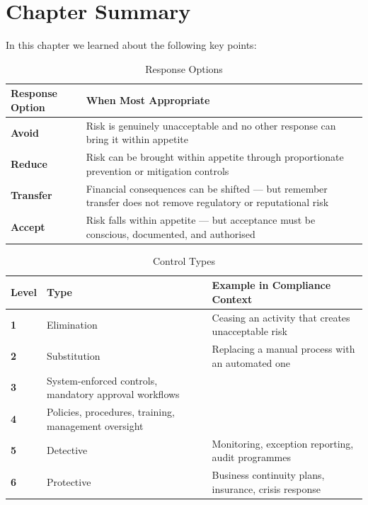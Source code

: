 \newpage
\section{Chapter Summary}
In this chapter we learned about the following key points:
\begin{table}[H]
  \centering
  \renewcommand{\arraystretch}{1.5}
  \begin{tabularx}{\textwidth}{ | >{\raggedright\arraybackslash}p{} 
                                | >{\raggedright\arraybackslash}X | }
    \hline
    \textbf{Response Option} & \textbf{When Most Appropriate} \\
    \hline
    \textbf{Avoid} & Risk is genuinely unacceptable and no other response can bring it within appetite\\
    \hline
    \textbf{Reduce} & Risk can be brought within appetite through proportionate prevention or mitigation controls\\
    \hline
    \textbf{Transfer} & Financial consequences can be shifted — but remember transfer does not remove regulatory or reputational risk\\
    \hline
    \textbf{Accept} & Risk falls within appetite — but acceptance must be conscious, documented, and authorised\\
    \hline
  \end{tabularx}
  \caption{Response Options}
\end{table}

\begin{table}[H]
  \centering
  \renewcommand{\arraystretch}{1.5}
  \begin{tabularx}{\textwidth}{ | >{\raggedright\arraybackslash}p{} 
                                | >{\raggedright\arraybackslash}p{} 
                                | >{\raggedright\arraybackslash}X | }
    \hline
    \textbf{Level} & \textbf{Type} & \textbf{Example in Compliance Context}\\
    \hline
    \textbf{1} & Elimination & Ceasing an activity that creates unacceptable risk\\
    \hline
    \textbf{2} & Substitution & Replacing a manual process with an automated one\\
    \hline
    \textbf{3} & System-enforced controls, mandatory approval workflows\\
    \hline
    \textbf{4} & Policies, procedures, training, management oversight\\
    \hline
    \textbf{5} & Detective & Monitoring, exception reporting, audit programmes\\
    \hline
    \textbf{6} & Protective & Business continuity plans, insurance, crisis response\\
    \hline
  \end{tabularx}
  \caption{Control Types}
\end{table}

